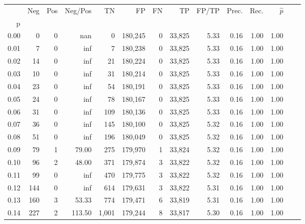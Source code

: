 \begin{tabular}{rrrrrrrrrrrrrr}
\toprule
{} &    Neg &    Pos & Neg/Pos &       TN &       FP &      FN &      TP & FP/TP & Prec. &  Rec. & $\hat{p}$ \\
p    &        &        &         &          &          &         &         &       &       &       &           \\
\midrule
0.00 &      0 &      0 &     nan &        0 &  180,245 &       0 &  33,825 &  5.33 &  0.16 &  1.00 &      1.00 \\
0.01 &      7 &      0 &     inf &        7 &  180,238 &       0 &  33,825 &  5.33 &  0.16 &  1.00 &      1.00 \\
0.02 &     14 &      0 &     inf &       21 &  180,224 &       0 &  33,825 &  5.33 &  0.16 &  1.00 &      1.00 \\
0.03 &     10 &      0 &     inf &       31 &  180,214 &       0 &  33,825 &  5.33 &  0.16 &  1.00 &      1.00 \\
0.04 &     23 &      0 &     inf &       54 &  180,191 &       0 &  33,825 &  5.33 &  0.16 &  1.00 &      1.00 \\
0.05 &     24 &      0 &     inf &       78 &  180,167 &       0 &  33,825 &  5.33 &  0.16 &  1.00 &      1.00 \\
0.06 &     31 &      0 &     inf &      109 &  180,136 &       0 &  33,825 &  5.33 &  0.16 &  1.00 &      1.00 \\
0.07 &     36 &      0 &     inf &      145 &  180,100 &       0 &  33,825 &  5.32 &  0.16 &  1.00 &      1.00 \\
0.08 &     51 &      0 &     inf &      196 &  180,049 &       0 &  33,825 &  5.32 &  0.16 &  1.00 &      1.00 \\
0.09 &     79 &      1 &   79.00 &      275 &  179,970 &       1 &  33,824 &  5.32 &  0.16 &  1.00 &      1.00 \\
0.10 &     96 &      2 &   48.00 &      371 &  179,874 &       3 &  33,822 &  5.32 &  0.16 &  1.00 &      1.00 \\
0.11 &     99 &      0 &     inf &      470 &  179,775 &       3 &  33,822 &  5.32 &  0.16 &  1.00 &      1.00 \\
0.12 &    144 &      0 &     inf &      614 &  179,631 &       3 &  33,822 &  5.31 &  0.16 &  1.00 &      1.00 \\
0.13 &    160 &      3 &   53.33 &      774 &  179,471 &       6 &  33,819 &  5.31 &  0.16 &  1.00 &      1.00 \\
0.14 &    227 &      2 &  113.50 &    1,001 &  179,244 &       8 &  33,817 &  5.30 &  0.16 &  1.00 &      1.00 \\

\end{tabular}
